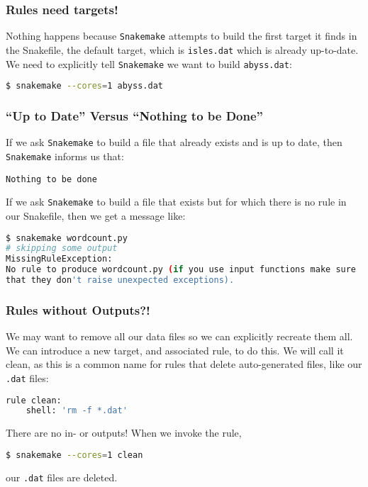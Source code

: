 \begin{frame}[fragile]
  \frametitle{Rules need targets!}
  Nothing happens because \texttt{Snakemake} attempts to build the first target it finds in the Snakefile, the default target, which is \texttt{isles.dat} which is already up-to-date. We need to explicitly tell \texttt{Snakemake} we want to build \texttt{abyss.dat}:
  \begin{lstlisting}[language=Bash, style=Shell]
$ snakemake --cores=1 abyss.dat
  \end{lstlisting}
\end{frame}

\begin{frame}[fragile]
  \frametitle{``Up to Date'' Versus ``Nothing to be Done''}
  If we ask \texttt{Snakemake} to build a file that already exists and is up to date, then \texttt{Snakemake} informs us that:
  \begin{lstlisting}[style=Plain]
Nothing to be done
  \end{lstlisting}
  \pause
  If we ask \texttt{Snakemake} to build a file that exists but for which there is no rule in our Snakefile, then we get a message like:
  \begin{lstlisting}[language=Bash, style=Shell, basicstyle=\footnotesize]
$ snakemake wordcount.py
# skipping some output
MissingRuleException:
No rule to produce wordcount.py (if you use input functions make sure
that they don't raise unexpected exceptions).
  \end{lstlisting}
\end{frame}

\begin{frame}[fragile]
  \frametitle{Rules without Outputs?!}
  We may want to remove all our data files so we can explicitly recreate them all. We can introduce a new target, and associated rule, to do this. We will call it clean, as this is a common name for rules that delete auto-generated files, like our \texttt{.dat} files:
  \begin{lstlisting}[language=Python,style=Python]
rule clean:
    shell: 'rm -f *.dat'
  \end{lstlisting}
  There are no in- or outputs! When we invoke the rule, 
  \begin{lstlisting}[language=Bash, style=Shell]
$ snakemake --cores=1 clean
  \end{lstlisting}
  our  \texttt{.dat} files are deleted.
\end{frame}

